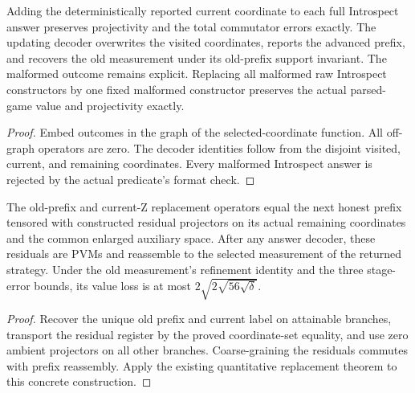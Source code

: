 \begin{lemma}
\label{lem:intro-answer-refinement}
\leanok
Adding the deterministically reported current coordinate to each full
Introspect answer preserves projectivity and the total commutator errors
exactly. The updating decoder overwrites the visited coordinates, reports
the advanced prefix, and recovers the old measurement under its old-prefix
support invariant. The malformed outcome remains explicit. Replacing all
malformed raw Introspect constructors by one fixed malformed constructor
preserves the actual parsed-game value and projectivity exactly.
\end{lemma}
\begin{proof}
\leanok
Embed outcomes in the graph of the selected-coordinate function. All
off-graph operators are zero. The decoder identities follow from the
disjoint visited, current, and remaining coordinates. Every malformed
Introspect answer is rejected by the actual predicate's format check.
\end{proof}

\begin{lemma}
\label{lem:intro-next-invariant}
\leanok
The old-prefix and current-Z replacement operators equal the next honest
prefix tensored with constructed residual projectors on its actual remaining
coordinates and the common enlarged auxiliary space. After any answer
decoder, these residuals are PVMs and reassemble to the selected measurement
of the returned strategy. Under the old measurement's refinement identity
and the three stage-error bounds, its value loss is at most
$2\sqrt{2\sqrt{56\sqrt{\delta}}}$.
\end{lemma}
\begin{proof}
\leanok
Recover the unique old prefix and current label on attainable branches,
transport the residual register by the proved coordinate-set equality,
and use zero ambient projectors on all other branches. Coarse-graining the
residuals commutes with prefix reassembly. Apply the existing quantitative
replacement theorem to this concrete construction.
\end{proof}

